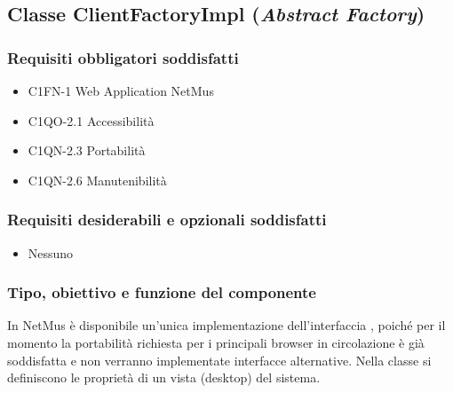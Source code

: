 \subsection{Classe ClientFactoryImpl (\emph{Abstract Factory})}
\subsubsection*{Requisiti obbligatori soddisfatti}
\begin{itemize}
    \item C1FN-1 Web Application NetMus
    \item C1QO-2.1 Accessibilit\`a
    \item C1QN-2.3 Portabilit\`a
    \item C1QN-2.6 Manutenibilit\`a
\end{itemize}
\subsubsection*{Requisiti desiderabili e opzionali soddisfatti}
\begin{itemize}
	\item Nessuno
\end{itemize}
\subsubsection*{Tipo, obiettivo e funzione del componente}
In NetMus \`e disponibile un'unica implementazione dell'interfaccia
, poich\'e per il momento la portabilit\`a richiesta per i
principali browser in circolazione \`e gi\`a soddisfatta e non verranno
implementate interfacce alternative. Nella classe si definiscono
le propriet\`a di un vista (desktop) del sistema.
